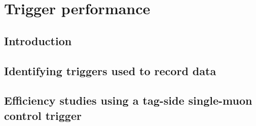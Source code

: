 \clearpage
\section{Trigger performance}
\label{sec:trigger}

\subsection{Introduction}



\subsection{Identifying triggers used to record data}



\subsection{Efficiency studies using a tag-side single-muon control trigger}



